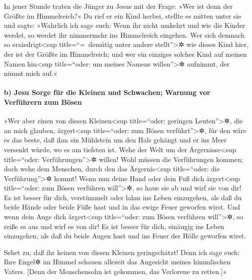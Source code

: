  In jener Stunde traten die Jünger zu Jesus mit der Frage:
»Wer ist denn der Größte im Himmelreich?«  Da rief er ein
Kind herbei, stellte es mitten unter sie  und sagte:
»Wahrlich ich sage euch: Wenn ihr nicht umkehrt und wie die Kinder
werdet, so werdet ihr nimmermehr ins Himmelreich eingehen.
 Wer sich demnach so erniedrigt\textless sup
title=``=~demütig unter andere stellt''\textgreater✲ wie dieses Kind
hier, der ist der Größte im Himmelreich;  und wer ein
einziges solches Kind auf meinen Namen hin\textless sup title=``oder: um
meines Namens willen''\textgreater✲ aufnimmt, der nimmt mich auf.«

\hypertarget{b-jesu-sorge-fuxfcr-die-kleinen-und-schwachen-warnung-vor-verfuxfchrern-zum-buxf6sen}{%
\paragraph{b) Jesu Sorge für die Kleinen und Schwachen; Warnung vor
Verführern zum
Bösen}\label{b-jesu-sorge-fuxfcr-die-kleinen-und-schwachen-warnung-vor-verfuxfchrern-zum-buxf6sen}}

 »Wer aber einen von diesen Kleinen\textless sup
title=``oder: geringen Leuten''\textgreater✲, die an mich glauben,
ärgert\textless sup title=``oder: zum Bösen verführt''\textgreater✲, für
den wäre es das beste, daß ihm ein Mühlstein um den Hals gehängt und er
ins Meer versenkt würde, wo es am tiefsten ist.  Wehe der
Welt um der Ärgernisse\textless sup title=``oder:
Verführungen''\textgreater✲ willen! Wohl müssen die Verführungen kommen;
doch wehe dem Menschen, durch den das Ärgernis\textless sup
title=``oder: die Verführung''\textgreater✲ kommt!  Wenn
nun deine Hand oder dein Fuß dich ärgert\textless sup title=``oder: zum
Bösen verführen will''\textgreater✲, so haue sie ab und wirf sie von
dir! Es ist besser für dich, verstümmelt oder lahm ins Leben einzugehen,
als daß du beide Hände oder beide Füße hast und in das ewige Feuer
geworfen wirst.  Und wenn dein Auge dich
ärgert\textless sup title=``oder: zum Bösen verführen
will''\textgreater✲, so reiße es aus und wirf es von dir! Es ist besser
für dich, einäugig ins Leben einzugehen, als daß du beide Augen hast und
ins Feuer der Hölle geworfen wirst.

 Sehet zu, daß ihr keinen von diesen Kleinen
geringschätzt! Denn ich sage euch: Ihre Engel✲ im Himmel schauen
allezeit das Angesicht meines himmlischen Vaters. 
{[}Denn der Menschensohn ist gekommen, das Verlorene zu retten.{]}«

